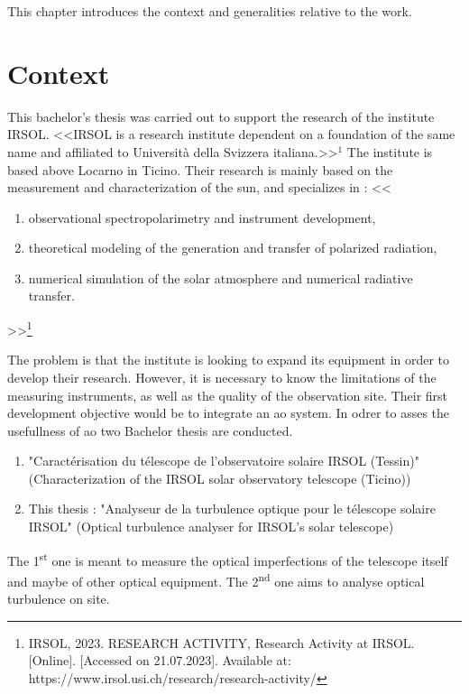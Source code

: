 This chapter introduces the context and generalities relative to the work.

\section{Context}
This bachelor's thesis was carried out to support the research of the institute \Gls{IRSOL}. \newline
<<\Gls{IRSOL} is a research institute dependent on a foundation of the same name and affiliated to Università della Svizzera italiana.>>$^1$
The institute is based above Locarno in Ticino. \newline
Their research is mainly based on the measurement and characterization of the sun, and specializes in :
<<
\begin{enumerate}
    \item observational spectropolarimetry and instrument development,
    \item theoretical modeling of the generation and transfer of polarized radiation,
    \item numerical simulation of the solar atmosphere and numerical radiative transfer.
\end{enumerate}>>\footnote{\cite{IRSOL_research} \Gls{IRSOL}, 2023. RESEARCH ACTIVITY, Research Activity at \Gls{IRSOL}. [Online]. [Accessed on 21.07.2023]. Available at: https://www.irsol.usi.ch/research/research-activity/}

The problem is that the institute is looking to expand its equipment in order to develop their research.
However, it is necessary to know the limitations of the measuring instruments, as well as the quality of the observation site.
Their first development objective would be to integrate an \acrfull{ao} system.
\newline
In odrer to asses the usefullness of \Gls{ao} two Bachelor thesis are conducted.
\begin{enumerate}
    \item "Caractérisation du télescope de l'observatoire solaire \Gls{IRSOL} (Tessin)" (Characterization of the \Gls{IRSOL} solar observatory telescope (Ticino))
    \item This thesis : "Analyseur de la turbulence optique pour le télescope solaire \Gls{IRSOL}" (Optical turbulence analyser for \Gls{IRSOL}'s solar telescope)
\end{enumerate}
The 1\textsuperscript{st} one is meant to measure the optical imperfections of the telescope itself and maybe of other optical equipment.
The 2\textsuperscript{nd} one aims to analyse optical turbulence on site.

